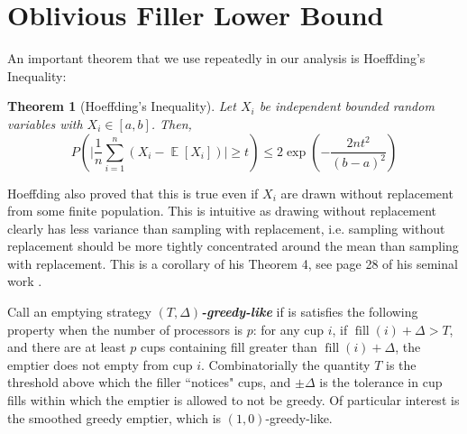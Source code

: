 \documentclass[twocolumn]{article}[10pt]
\newcommand{\defn}[1]{{\textit{\textbf{\boldmath #1}}}\xspace}
\DeclareMathOperator{\E}{\mathbb{E}}
\DeclareMathOperator{\fil}{\text{fill}}
\newtheorem{theorem}{Theorem}
\begin{document}
\section{Oblivious Filler Lower Bound}\label{sec:oblivious}

An important theorem that we use repeatedly in our analysis is Hoeffding's Inequality:
\begin{theorem}[Hoeffding's Inequality]
  Let $X_i$ be independent bounded random variables with $X_i \in [a,b]$. Then,
  $$P\left(\Big|\frac{1}{n} \sum_{i=1}^n (X_i - \E[X_i])\Big|\ge t\right) \le
  2\exp\left(-\frac{2nt^2}{(b-a)^2}\right) $$
\end{theorem}
Hoeffding also proved that this is true even if $X_i$ are drawn without
replacement from some finite population. This is intuitive as drawing without
replacement clearly has less variance than sampling with replacement, i.e.
sampling without replacement should be more tightly concentrated around the
mean than sampling with replacement. This is a corollary of his Theorem 4, see
page 28 of his seminal work \cite{who62}.

Call an emptying strategy $(T, \Delta)$\defn{-greedy-like} if is satisfies
the following property when the number of processors is $p$: for any cup
$i$, if $\fil(i) + \Delta > T$, and there are at least $p$ cups containing fill
greater than $\fil(i) + \Delta$, the emptier does not empty from cup $i$. 
Combinatorially the quantity $T$ is the threshold above which the filler
``notices" cups, and $\pm\Delta$ is the tolerance in cup fills within which the
emptier is allowed to not be greedy.
Of particular interest is the smoothed greedy emptier, which is $(1, 0)$-greedy-like.
\end{document}
